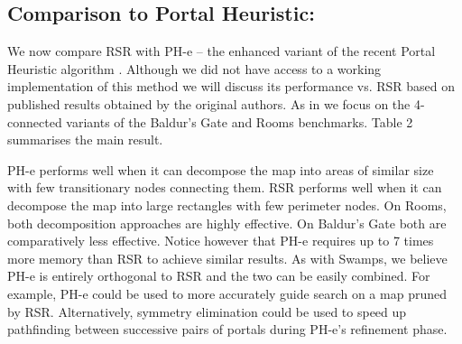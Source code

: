 \subsection{Comparison to Portal Heuristic:}
We now compare RSR with PH-e -- the enhanced variant of the recent 
Portal Heuristic algorithm \citep{goldenberg10}.
Although we did not have access to a working implementation of this method we
will discuss its performance vs. RSR based on published results obtained by the
original authors. As in \citep{goldenberg10} we focus on the 4-connected variants 
of the Baldur's Gate and Rooms benchmarks.
Table 2 summarises the main result.
\par
PH-e performs well when it can decompose the map into areas of similar size with
few transitionary nodes connecting them.
RSR performs well when it can decompose the map into large rectangles with few
perimeter nodes.
On Rooms, both decomposition approaches are highly effective. 
On Baldur's Gate both are comparatively less effective.
Notice however that PH-e requires up to 7 times more memory than RSR to achieve
similar results.
As with Swamps, we believe PH-e is entirely orthogonal to RSR and the two can be 
easily combined. For example, PH-e could be used to more accurately guide search
on a map pruned by RSR. Alternatively, symmetry elimination could be used to 
speed up pathfinding between successive pairs of portals during PH-e's refinement phase.

